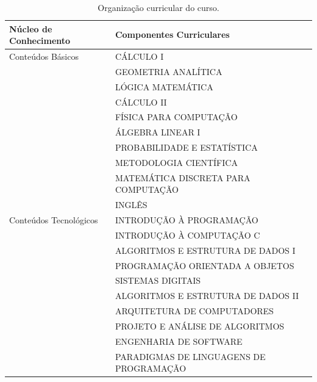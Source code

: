 \documentclass[
	12pt,				%
	openright,			%
  oneside,     %
	a4paper,			%
	chapter=TITLE,		%
	english,			%
	french,				%
	spanish,			%
	brazil				%
	]{abntex2}
\begin{document}
\begin{center}
    \begin{scriptsize}
      \begin{longtable}{@{}lp{10cm}}
        \caption{\label{quadro:organizacao-curricular-do-curso}Organização curricular do curso.}\\
      \toprule
      \textbf{Núcleo de Conhecimento} & \textbf{Componentes Curriculares} \\ 
      \midrule
        Conteúdos Básicos 
                                & CÁLCULO I \\
                                & GEOMETRIA ANALÍTICA \\
                                & LÓGICA MATEMÁTICA \\
                                & CÁLCULO II \\
                                & FÍSICA PARA COMPUTAÇÃO \\ 
                                & ÁLGEBRA LINEAR I \\
                                & PROBABILIDADE E ESTATÍSTICA \\
                                & METODOLOGIA CIENTÍFICA \\
                                & MATEMÁTICA DISCRETA PARA COMPUTAÇÃO \\
                                & INGLÊS  \\
                                \midrule
        Conteúdos Tecnológicos
                                & INTRODUÇÃO À PROGRAMAÇÃO \\
                                & INTRODUÇÃO À COMPUTAÇÃO C \\
                                & ALGORITMOS E ESTRUTURA DE DADOS I\\
                                & PROGRAMAÇÃO ORIENTADA A OBJETOS \\
                                & SISTEMAS DIGITAIS \\
                                & ALGORITMOS E ESTRUTURA DE DADOS II \\
                                & ARQUITETURA DE COMPUTADORES \\
                                & PROJETO E ANÁLISE DE ALGORITMOS \\
                                & ENGENHARIA DE SOFTWARE \\
                                & PARADIGMAS DE LINGUAGENS DE PROGRAMAÇÃO \\

\end{longtable}
\end{scriptsize}
\end{center}
\end{document}
